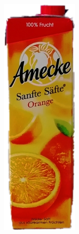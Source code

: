 \begin{appendices}
\begin{figure}[htb]
\begin{minipage}[c]{0.08\textwidth}
\includegraphics[width=\textwidth]{Sources/Bild1_HS.png}

\end{minipage}
\end{figure}
\end{appendices}
